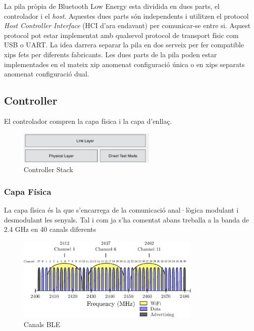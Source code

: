 La pila pròpia de Bluetooth Low Energy esta dividida en dues parts, el controlador i el \textit{host}. Aquestes dues parts són independents i utilitzen el protocol \textit{Host Controller Interface} (HCI d'ara endavant) per comunicar-se entre si.
Aquest protocol pot estar implementat amb qualsevol protocol de transport físic com USB o UART.
La idea darrera separar la pila en dos serveix per fer compatible xips fets per diferents fabricants.
Les dues parts de la pila poden estar implementades en el mateix xip anomenat configuració única o en xips separats anomenat configuració dual.


\subsection{Controller}
El controlador compren la capa física i la capa d'enllaç.

\begin{figure}[h!]
	\begin{center}
		\includegraphics[width=0.6\textwidth]{./images/controller.png}
		\caption{Controller Stack}
	\end{center}
\end{figure}

\subsubsection{Capa Física}
La capa física és la que s'encarrega de la comunicació anal·lògica modulant i desmodulant les senyals.
Tal i com ja s'ha comentat abans treballa a la banda de 2.4 GHz en 40 canals diferents

\begin{figure}[hb]
	\begin{center}
		\includegraphics[width=0.8\textwidth]{./diagrames/BLE_WiFi}
		\caption{Canals BLE}
		\label{BLE_Channels}
	\end{center}
\end{figure}

